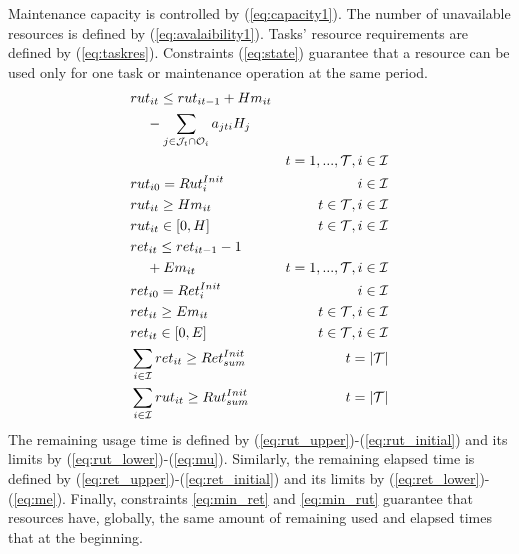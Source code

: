 \documentclass[a4paper,twocolumn,fleqn]{article}
\begin{document}
    Maintenance capacity is controlled by (\ref{eq:capacity1}). The number of unavailable resources is defined by (\ref{eq:avalaibility1}). Tasks' resource requirements are defined by (\ref{eq:taskres}). Constraints (\ref{eq:state}) guarantee that a resource can be used only for one task or maintenance operation at the same period.  
    \begin{align}
         & rut_{it} \leq rut_{it-1} + H m_{it} \notag \\ 
           &\hspace*{4mm}- \sum_{j \in \mathcal{J}_t \cap \mathcal{O}_i} a_{jti} H_j \notag \\
                && t =1, ..., \mathcal{T}, i \in \mathcal{I} \label{eq:rut_upper}\\
        & rut_{i0} = Rut^{Init}_i
               & i \in \mathcal{I} \label{eq:rut_initial}\\
        & rut_{it} \geq H m_{it}
                & t \in \mathcal{T}, i \in \mathcal{I}\label{eq:rut_lower}\\ 
        & rut_{it} \in [0,H]
                & t \in \mathcal{T}, i \in \mathcal{I} \label{eq:mu} \\
        & ret_{it} \leq ret_{it-1} - 1 \notag \\
          &\hspace*{4mm}+ E m_{it}
                & t =1, ..., \mathcal{T}, i \in \mathcal{I} \label{eq:ret_upper}\\
        & ret_{i0} = Ret^{Init}_i
                & i \in \mathcal{I} \label{eq:ret_initial}\\
        & ret_{it} \geq E m_{it}
                & t \in \mathcal{T}, i \in \mathcal{I}\label{eq:ret_lower}\\                 
        & ret_{it} \in [0,E]
                & t \in \mathcal{T}, i \in \mathcal{I} \label{eq:me}\\
        & \sum_{i \in \mathcal{I}} ret_{it} \geq Ret^{Init}_{sum}
              & t = |\mathcal{T}| \label{eq:min_ret}\\
        & \sum_{i \in \mathcal{I}} rut_{it} \geq Rut^{Init}_{sum}
              & t = |\mathcal{T}| \label{eq:min_rut}
    \end{align}
    The remaining usage time is defined by (\ref{eq:rut_upper})-(\ref{eq:rut_initial}) and its limits by (\ref{eq:rut_lower})-(\ref{eq:mu}). 
    Similarly, the remaining elapsed time is defined by (\ref{eq:ret_upper})-(\ref{eq:ret_initial}) and its limits by (\ref{eq:ret_lower})-(\ref{eq:me}). 
    Finally, constraints \ref{eq:min_ret} and \ref{eq:min_rut} guarantee that resources have, globally, the same amount of remaining used and elapsed times that at the beginning.
\end{document}
